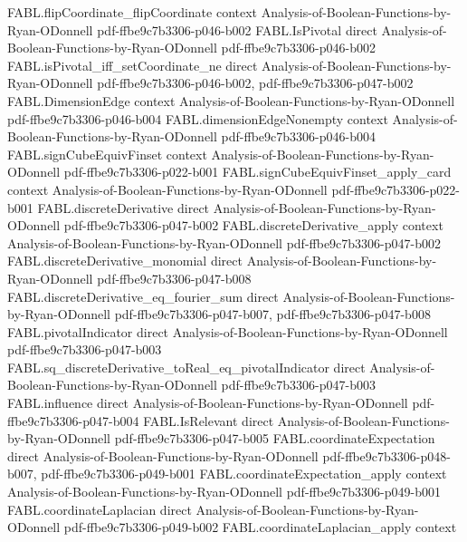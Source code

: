 \begin{theorem}
  {FABL.flipCoordinate_flipCoordinate}
  {context}
  {Analysis-of-Boolean-Functions-by-Ryan-ODonnell}
  {pdf-ffbe9c7b3306-p046-b002}
\proofstep
  {FABL.IsPivotal}
  {direct}
  {Analysis-of-Boolean-Functions-by-Ryan-ODonnell}
  {pdf-ffbe9c7b3306-p046-b002}
\proofstep
  {FABL.isPivotal_iff_setCoordinate_ne}
  {direct}
  {Analysis-of-Boolean-Functions-by-Ryan-ODonnell}
  {pdf-ffbe9c7b3306-p046-b002,
    pdf-ffbe9c7b3306-p047-b002}
\proofstep
  {FABL.DimensionEdge}
  {context}
  {Analysis-of-Boolean-Functions-by-Ryan-ODonnell}
  {pdf-ffbe9c7b3306-p046-b004}
\proofstep
  {FABL.dimensionEdgeNonempty}
  {context}
  {Analysis-of-Boolean-Functions-by-Ryan-ODonnell}
  {pdf-ffbe9c7b3306-p046-b004}
\proofstep
  {FABL.signCubeEquivFinset}
  {context}
  {Analysis-of-Boolean-Functions-by-Ryan-ODonnell}
  {pdf-ffbe9c7b3306-p022-b001}
\proofstep
  {FABL.signCubeEquivFinset_apply_card}
  {context}
  {Analysis-of-Boolean-Functions-by-Ryan-ODonnell}
  {pdf-ffbe9c7b3306-p022-b001}
\proofstep
  {FABL.discreteDerivative}
  {direct}
  {Analysis-of-Boolean-Functions-by-Ryan-ODonnell}
  {pdf-ffbe9c7b3306-p047-b002}
\proofstep
  {FABL.discreteDerivative_apply}
  {context}
  {Analysis-of-Boolean-Functions-by-Ryan-ODonnell}
  {pdf-ffbe9c7b3306-p047-b002}
\proofstep
  {FABL.discreteDerivative_monomial}
  {direct}
  {Analysis-of-Boolean-Functions-by-Ryan-ODonnell}
  {pdf-ffbe9c7b3306-p047-b008}
\proofstep
  {FABL.discreteDerivative_eq_fourier_sum}
  {direct}
  {Analysis-of-Boolean-Functions-by-Ryan-ODonnell}
  {pdf-ffbe9c7b3306-p047-b007,
    pdf-ffbe9c7b3306-p047-b008}
\proofstep
  {FABL.pivotalIndicator}
  {direct}
  {Analysis-of-Boolean-Functions-by-Ryan-ODonnell}
  {pdf-ffbe9c7b3306-p047-b003}
\proofstep
  {FABL.sq_discreteDerivative_toReal_eq_pivotalIndicator}
  {direct}
  {Analysis-of-Boolean-Functions-by-Ryan-ODonnell}
  {pdf-ffbe9c7b3306-p047-b003}
\proofstep
  {FABL.influence}
  {direct}
  {Analysis-of-Boolean-Functions-by-Ryan-ODonnell}
  {pdf-ffbe9c7b3306-p047-b004}
\proofstep
  {FABL.IsRelevant}
  {direct}
  {Analysis-of-Boolean-Functions-by-Ryan-ODonnell}
  {pdf-ffbe9c7b3306-p047-b005}
\proofstep
  {FABL.coordinateExpectation}
  {direct}
  {Analysis-of-Boolean-Functions-by-Ryan-ODonnell}
  {pdf-ffbe9c7b3306-p048-b007,
    pdf-ffbe9c7b3306-p049-b001}
\proofstep
  {FABL.coordinateExpectation_apply}
  {context}
  {Analysis-of-Boolean-Functions-by-Ryan-ODonnell}
  {pdf-ffbe9c7b3306-p049-b001}
\proofstep
  {FABL.coordinateLaplacian}
  {direct}
  {Analysis-of-Boolean-Functions-by-Ryan-ODonnell}
  {pdf-ffbe9c7b3306-p049-b002}
\proofstep
  {FABL.coordinateLaplacian_apply}
  {context}

\end{theorem}

